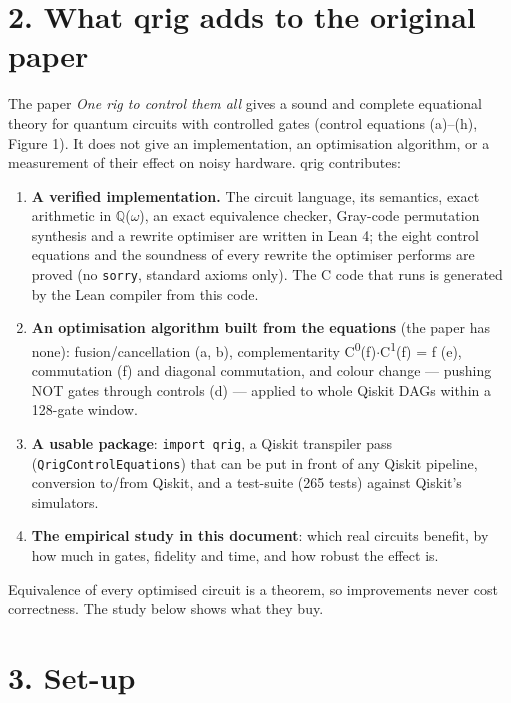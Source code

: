 \documentclass[
  10pt,
]{article}
\newcounter{none} %
\providecommand{\tightlist}{%
  \setlength{\itemsep}{0pt}\setlength{\parskip}{0pt}}
\begin{document}
\section{2. What qrig adds to the original
paper}\label{what-qrig-adds-to-the-original-paper}

The paper \emph{One rig to control them all} gives a sound and complete
equational theory for quantum circuits with controlled gates (control
equations (a)--(h), Figure 1). It does not give an implementation, an
optimisation algorithm, or a measurement of their effect on noisy
hardware. qrig contributes:

\begin{enumerate}
\def\labelenumi{\arabic{enumi}.}
\tightlist
\item
  \textbf{A verified implementation.} The circuit language, its
  semantics, exact arithmetic in \ensuremath{\mathbb{Q}}(\ensuremath{\omega}), an exact equivalence checker,
  Gray-code permutation synthesis and a rewrite optimiser are written in
  Lean 4; the eight control equations and the soundness of every rewrite
  the optimiser performs are proved (no \texttt{sorry}, standard axioms
  only). The C code that runs is generated by the Lean compiler from
  this code.
\item
  \textbf{An optimisation algorithm built from the equations} (the paper
  has none): fusion/cancellation (a, b), complementarity C\textsuperscript{0}(f)\ensuremath{\cdot}C\textsuperscript{1}(f) = f
  (e), commutation (f) and diagonal commutation, and colour change ---
  pushing NOT gates through controls (d) --- applied to whole Qiskit
  DAGs within a 128-gate window.
\item
  \textbf{A usable package}: \texttt{import\ qrig}, a Qiskit transpiler
  pass (\texttt{QrigControlEquations}) that can be put in front of any
  Qiskit pipeline, conversion to/from Qiskit, and a test-suite (265
  tests) against Qiskit's simulators.
\item
  \textbf{The empirical study in this document}: which real circuits
  benefit, by how much in gates, fidelity and time, and how robust the
  effect is.
\end{enumerate}

Equivalence of every optimised circuit is a theorem, so improvements
never cost correctness. The study below shows what they buy.

\section{3. Set-up}\label{set-up}
\end{document}
